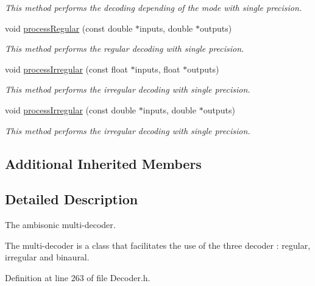 \begin{DoxyCompactItemize}
\begin{DoxyCompactList}\small\item\em This method performs the decoding depending of the mode with single precision. \end{DoxyCompactList}\item 
void \hyperlink{class_hoa2_d_1_1_decoder_multi_a594583b4853dcabf5f655412faad0fe7}{process\-Regular} (const double $\ast$inputs, double $\ast$outputs)
\begin{DoxyCompactList}\small\item\em This method performs the regular decoding with single precision. \end{DoxyCompactList}\item 
void \hyperlink{class_hoa2_d_1_1_decoder_multi_ae7b3be8b1b39a2242a4a270d5278a4f6}{process\-Irregular} (const float $\ast$inputs, float $\ast$outputs)
\begin{DoxyCompactList}\small\item\em This method performs the irregular decoding with single precision. \end{DoxyCompactList}\item 
void \hyperlink{class_hoa2_d_1_1_decoder_multi_a11493b383a19d621202acebb17568000}{process\-Irregular} (const double $\ast$inputs, double $\ast$outputs)
\begin{DoxyCompactList}\small\item\em This method performs the irregular decoding with single precision. \end{DoxyCompactList}\end{DoxyCompactItemize}
\subsection*{Additional Inherited Members}


\subsection{Detailed Description}
The ambisonic multi-\/decoder. 

The multi-\/decoder is a class that facilitates the use of the three decoder \-: regular, irregular and binaural. 

Definition at line 263 of file Decoder.\-h.



